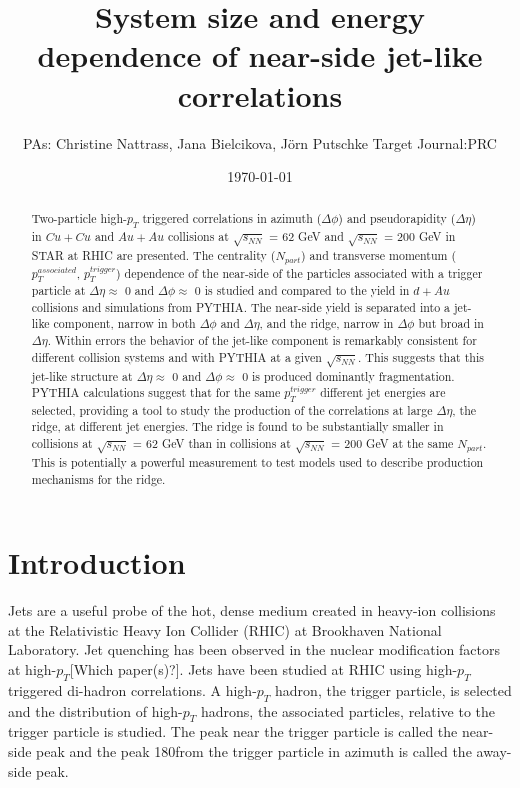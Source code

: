 \documentclass[aps,prc,twocolumn,groupedaddress,showpacs,preprintnumbers,amsmath,amssymb]{revtex4}
\newcommand{\sNNtwohundred}{$\sqrt{s_{NN}}$ = 200 GeV\xspace}
\newcommand{\sNNsixtytwo}{$\sqrt{s_{NN}}$ = 62 GeV\xspace}
\newcommand{\sNN}{$\sqrt{s_{NN}}$\xspace}
\newcommand{\pttrig}{$p_T^{trigger}$\xspace}
\newcommand{\ptassoc}{$p_T^{associated}$\xspace}
\newcommand{\npart}{$N_{part}$\xspace}
\newcommand{\pT}{$p_T$\xspace}
\newcommand{\highpT}{high-\pT}
\newcommand{\ridge}{ridge\xspace}
\newcommand{\Cu}{$Cu+Cu$\xspace}
\newcommand{\Au}{$Au+Au$\xspace}
\newcommand{\dAu}{$d+Au$\xspace}
\newcommand{\dphi}{$\Delta\phi$\xspace}
\newcommand{\deta}{$\Delta\eta$\xspace}
\newcommand{\as}{away-side\xspace}
\newcommand{\ns}{near-side\xspace}
\newcommand{\nearside}{near-side\xspace}
\newcommand{\jl}{jet-like\xspace}
\newcommand{\PT}{PYTHIA\xspace}
\begin{document}
\title{System size and energy dependence of \nearside jet-like correlations}
\author{PAs: Christine Nattrass, Jana Bielcikova, J\"orn Putschke \hspace{1.5cm} Target Journal:PRC}
\date{\today}%

\begin{abstract}
Two-particle \highpT triggered correlations in azimuth (\dphi) and pseudorapidity (\deta) in \Cu and \Au collisions at \sNNsixtytwo and \sNNtwohundred in STAR at RHIC are presented.  The centrality (\npart) and transverse momentum (\ptassoc, \pttrig) dependence of the \nearside of the particles associated with a trigger particle at \deta $\approx$ 0 and \dphi $\approx$ 0 is studied and compared to the yield in \dAu collisions and simulations from \PT.  The \ns yield is separated into a jet-like component, narrow in both \dphi and \deta, and the \ridge, narrow in \dphi but broad in \deta.  Within errors the behavior of the \jl component is remarkably consistent for different collision systems and with \PT at a given \sNN.  This suggests that this \jl structure at \deta $\approx$ 0 and \dphi $\approx$ 0 is produced dominantly fragmentation.  \PT calculations suggest that for the same \pttrig different jet energies are selected, providing a tool to study the production of the correlations at large \deta, the \ridge, at different jet energies.  The \ridge is found to be substantially smaller in collisions at \sNNsixtytwo than in collisions at \sNNtwohundred at the same \npart.  This is potentially a powerful measurement to test models used to describe production mechanisms for the \ridge.
\end{abstract}

\maketitle
\section{Introduction}

Jets are a useful probe of the hot, dense medium created in heavy-ion collisions at the Relativistic Heavy Ion Collider (RHIC) at Brookhaven National Laboratory.  Jet quenching has been observed in the nuclear modification factors at high-\pT [Which paper(s)?].  Jets have been studied at RHIC using high-\pT triggered di-hadron correlations.  A high-\pT hadron, the trigger particle, is selected and the distribution of high-\pT hadrons, the associated particles, relative to the trigger particle is studied.  The peak near the trigger particle is called the \ns peak and the peak 180\textdegree from the trigger particle in azimuth is called the \as peak.
\end{document}
